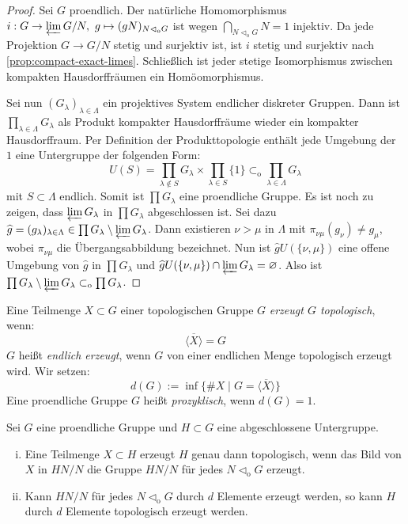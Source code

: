\documentclass[11pt,a4paper,openany]{memoir}
\begin{document}
\begin{proof}
Sei $G$ proendlich. Der natürliche Homomorphismus $i:G\to\varprojlim G/N,\ g\mapsto (gN)_{N\lhd_\text{o}G}$ ist wegen $\bigcap_{N\lhd_\text{o}G}N=1$ injektiv. Da jede Projektion $G\to G/N$ stetig und surjektiv ist, ist $i$ stetig und surjektiv nach \ref{prop:compact-exact-limes}. Schließlich ist jeder stetige Isomorphismus zwischen kompakten Hausdorffräumen ein Homöomorphismus.

Sei nun $(G_\lambda)_{\lambda\in\Lambda}$ ein projektives System end\-li\-cher dis\-kre\-ter Gruppen. Dann ist $\prod_{\lambda\in\Lambda}G_\lambda$ als Produkt kompakter Hausdorffräume wieder ein kompakter Hausdorffraum. Per Definition der Produkttopologie enthält jede Umgebung der $1$ eine Untergruppe der folgenden Form:
\[U(S)=\prod_{\lambda\not\in S}G_\lambda\times\prod_{\lambda\in S}\{1\}\subset_\text{o}\prod_{\lambda\in\Lambda}G_\lambda \]
mit $S\subset\Lambda$ endlich. Somit ist $\prod G_\lambda$ eine proendliche Gruppe. Es ist noch zu zeigen, dass $\varprojlim G_\lambda$ in $\prod G_\lambda$ abgeschlossen ist. Sei dazu $\widehat{g}=(g_\lambda)_{\lambda\in\Lambda}\in \prod G_\lambda \setminus \varprojlim G_\lambda$. Dann existieren $\nu>\mu$ in $\Lambda$ mit $\pi_{\nu\mu}(g_\nu)\neq g_\mu$, wobei $\pi_{\nu\mu}$ die Übergangsabbildung bezeichnet. Nun ist $\widehat{g}U(\{\nu,\mu\})$ eine offene Umgebung von $\widehat{g}$ in $\prod G_\lambda$ und $\widehat{g}U(\{\nu,\mu\})\cap\varprojlim G_\lambda=\varnothing$. Also ist $\prod G_\lambda\setminus\varprojlim G_\lambda\subset_\text{o} \prod G_\lambda$.
\end{proof}
\fi

\begin{definition}
Eine Teilmenge $X\subset G$ einer topologischen Gruppe $G$ \textit{erzeugt $G$ topologisch}, wenn: \[\overline{\langle X\rangle}=G\] $G$ heißt \textit{endlich erzeugt}, wenn $G$ von einer endlichen Menge topologisch erzeugt wird. Wir setzen:
\[d(G):=\inf\{\#X\mid G=\overline{\langle X\rangle}\} \]
Eine proendliche Gruppe $G$ heißt \textit{prozyklisch}, wenn $d(G)=1$.
\end{definition}

\iffalse
\begin{proposition}\label{1.5}
Sei $G$ eine proendliche Gruppe und $H\subset G$ eine abgeschlossene Untergruppe.
\begin{enumerate}[(i)]
\item Eine Teilmenge $X\subset H$ erzeugt $H$ genau dann topologisch, wenn das Bild von $X$ in $HN/N$ die Gruppe $HN/N$ für jedes $N\lhd_\text{o}G$ erzeugt.
\item Kann $HN/N$ für jedes $N\lhd_\text{o}G$ durch $d$ Elemente erzeugt werden, so kann $H$ durch $d$ Elemente topologisch erzeugt werden.
\end{enumerate}
\end{proposition}
\end{document}
